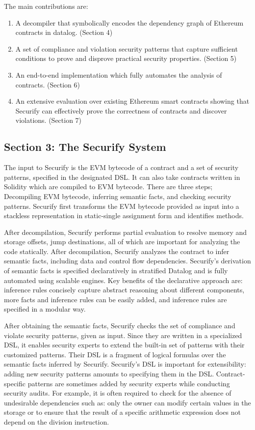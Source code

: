 \documentclass{article}
\begin{document}
The main contributions are:

\begin{enumerate}
    \item A decompiler that symbolically encodes the dependency graph of Ethereum contracts in datalog. (Section 4)
    \item A set of compliance and violation security patterns that capture sufficient conditions to prove and disprove practical security properties. (Section 5)
    \item An end-to-end implementation which fully automates the analysis of contracts. (Section 6)
    \item An extensive evaluation over existing Ethereum smart contracts showing that Securify can effectively prove the correctness of contracts and discover violations. (Section 7)
\end{enumerate}

\subsection{Section 3: The Securify System}

The input to Securify is the EVM bytecode of a contract and a set of security patterns, specified in the designated DSL. It can also take contracts written in Solidity which are compiled to EVM bytecode. There are three steps; Decompiling EVM bytecode, inferring semantic facts, and checking security patterns. Securify first transforms the EVM bytecode provided as input into a stackless representation in static-single assignment form and identifies methods. 

After decompilation, Securify performs partial evaluation to resolve memory and storage offsets, jump destinations, all of which are important for analyzing the code statically. After decompilation, Securify analyzes the contract to infer semantic facts, including data and control flow dependencies. Securify's derivation of semantic facts is specified declaratively in stratified Datalog and is fully automated using scalable engines. Key benefits of the declarative approach are: inference rules concisely capture abstract reasoning about different components, more facts and inference rules can be easily added, and inference rules are specified in a modular way. 

After obtaining the semantic facts, Securify checks the set of compliance and violate security patterns, given as input. Since they are written in a specialized DSL, it enables security experts to extend the built-in set of patterns with their customized patterns. Their DSL is a fragment of logical formulas over the semantic facts inferred by Securify. Securify's DSL is important for extensibility: adding new security patterns amounts to specifying them in the DSL. Contract-specific patterns are sometimes added by security experts while conducting security audits. For example, it is often required to check for the absence of undesirable dependencies such as: only the owner can modify certain values in the storage or to ensure that the result of a specific arithmetic expression does not depend on the division instruction. 
\end{document}
